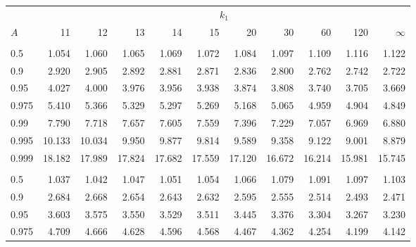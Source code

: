 \documentclass[
]{article}
\begin{document}
\begin{table}[H]
\centering
\begin{tabular}{lrrrrrrrrrr}
\toprule
\multicolumn{1}{c}{ } & \multicolumn{10}{c}{$k_1$} \\
\cmidrule(l{3pt}r{3pt}){2-11}
\hspace{1.1em}$A$ & 11 & 12 & 13 & 14 & 15 & 20 & 30 & 60 & 120 & $\infty$\\
\midrule
\addlinespace[0.3em]
\multicolumn{11}{l}{\textbf{$k_2=6$}}\\
\hspace{1em}0.5 & 1.054 & 1.060 & 1.065 & 1.069 & 1.072 & 1.084 & 1.097 & 1.109 & 1.116 & 1.122\\
\hspace{1em}0.9 & 2.920 & 2.905 & 2.892 & 2.881 & 2.871 & 2.836 & 2.800 & 2.762 & 2.742 & 2.722\\
\hspace{1em}0.95 & 4.027 & 4.000 & 3.976 & 3.956 & 3.938 & 3.874 & 3.808 & 3.740 & 3.705 & 3.669\\
\hspace{1em}0.975 & 5.410 & 5.366 & 5.329 & 5.297 & 5.269 & 5.168 & 5.065 & 4.959 & 4.904 & 4.849\\
\hspace{1em}0.99 & 7.790 & 7.718 & 7.657 & 7.605 & 7.559 & 7.396 & 7.229 & 7.057 & 6.969 & 6.880\\
\hspace{1em}0.995 & 10.133 & 10.034 & 9.950 & 9.877 & 9.814 & 9.589 & 9.358 & 9.122 & 9.001 & 8.879\\
\hspace{1em}0.999 & 18.182 & 17.989 & 17.824 & 17.682 & 17.559 & 17.120 & 16.672 & 16.214 & 15.981 & 15.745\\
\addlinespace[0.3em]
\multicolumn{11}{l}{\textbf{$k_2=7$}}\\
\hspace{1em}0.5 & 1.037 & 1.042 & 1.047 & 1.051 & 1.054 & 1.066 & 1.079 & 1.091 & 1.097 & 1.103\\
\hspace{1em}0.9 & 2.684 & 2.668 & 2.654 & 2.643 & 2.632 & 2.595 & 2.555 & 2.514 & 2.493 & 2.471\\
\hspace{1em}0.95 & 3.603 & 3.575 & 3.550 & 3.529 & 3.511 & 3.445 & 3.376 & 3.304 & 3.267 & 3.230\\
\hspace{1em}0.975 & 4.709 & 4.666 & 4.628 & 4.596 & 4.568 & 4.467 & 4.362 & 4.254 & 4.199 & 4.142\\

\end{tabular}
\end{table}
\end{document}
